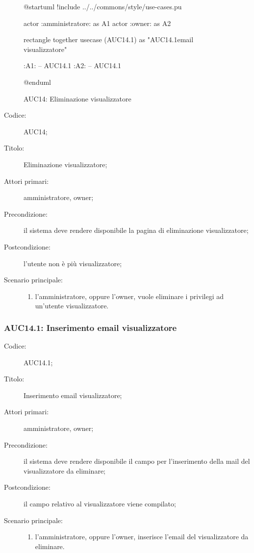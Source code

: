 \documentclass[../../../analisi-dei-requisiti.tex]{subfiles}
\begin{document}
\begin{figure}[H]
  \centering
  \begin{plantuml}
    @startuml
    !include ../../commons/style/use-cases.pu

    actor :amministratore: as A1
    actor :owner: as A2

    rectangle {
        together {
            usecase (AUC14.1) as "AUC14.1\nInserimento email visualizzatore"
          }
      }

    :A1: -- AUC14.1
    :A2: -- AUC14.1

    @enduml
  \end{plantuml}
  \caption{AUC14: Eliminazione visualizzatore}%
  \label{fig:auc14}
\end{figure}

\begin{description}
  \item[Codice:] AUC14;
  \item[Titolo:] Eliminazione visualizzatore;
  \item[Attori primari:] amministratore, owner;
  \item[Precondizione:] il sistema deve rendere disponibile la pagina di eliminazione visualizzatore;
  \item[Postcondizione:] l'utente non è più visualizzatore;
  \item[Scenario principale:]
        \begin{enumerate}
          \item l'amministratore, oppure l'owner, vuole eliminare i privilegi ad un'utente visualizzatore.
        \end{enumerate}
\end{description}

\subsubsection{AUC14.1: Inserimento email visualizzatore}%
\label{subs:AUC14.1}
\begin{description}
  \item[Codice:] AUC14.1;
  \item[Titolo:] Inserimento email visualizzatore;
  \item[Attori primari:] amministratore, owner;
  \item[Precondizione:] il sistema deve rendere disponibile il campo per l'inserimento della mail del visualizzatore da eliminare;
  \item[Postcondizione:] il campo relativo al visualizzatore viene compilato;
  \item[Scenario principale:]
        \begin{enumerate}
          \item l'amministratore, oppure l'owner, inserisce l'email del visualizzatore da eliminare.
        \end{enumerate}
\end{description}
\end{document}
